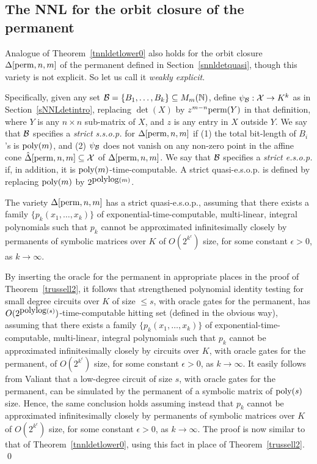 \documentclass[11pt]{article}
\begin{document}
\subsection{The NNL for the orbit closure of the permanent}
Analogue of Theorem~\ref{tnnldetlower0} also holds for the orbit closure $\Delta[{\mbox {perm}},n,m]$  of the permanent
defined in Section~\ref{snnldetquasi}, though this variety  is not explicit.
So let us call it {\em weakly explicit}.

Specifically, given any set ${\cal B}=\{B_1,\ldots,B_k\} \subseteq M_m(\mathbb{N})$, define 
$\psi_{{\cal B}}: {\cal X} \rightarrow K^k$ as in Section~\ref{sNNLdetintro},
replacing $\det(X)$  by  $z^{m-n} {\mbox {perm}}(Y)$ in that definition, where $Y$ is any $n\times n$ sub-matrix of $X$, and
$z$ is any entry in $X$ outside $Y$. We say that ${\cal B}$ specifies a 
{\em strict s.s.o.p.} 
for $\Delta[{\mbox {perm}},n,m]$ if 
(1) the total bit-length of $B_i$'s is ${\mbox {poly}}(m)$, and (2)
$\psi_{{\cal B}}$ does not vanish on any non-zero point in the affine cone  $\hat \Delta[{\mbox {perm}},n,m] \subseteq {\cal X}$ of
$\Delta[{\mbox {perm}},n,m]$.
We say that ${\cal B}$ specifies a {\em strict   e.s.o.p.} if, in addition,  it is ${\mbox {poly}}(m)$-time-computable. 
A strict quasi-e.s.o.p. is defined by replacing ${\mbox {poly}}(m)$  by $2^{{\mbox {polylog}}(m)}$.

\begin{theorem} 
The variety  $\Delta[{\mbox {perm}},n,m]$ has a strict quasi-e.s.o.p., assuming that there exists 
a family $\{p_k(x_1,\ldots,x_k)\}$ of  exponential-time-computable, 
multi-linear, integral polynomials  such that $p_k$
cannot be approximated infinitesimally closely by permanents 
of symbolic matrices  over $K$ of  
$O(2^{k^\epsilon})$ size, for some constant
$\epsilon >0$, as $k\rightarrow \infty$.
\end{theorem}

\proof 
By inserting the oracle for the permanent in 
appropriate places in the proof of Theorem~\ref{trussell2}, it follows that
strengthened polynomial identity testing for small degree 
circuits  over $K$ of size $\le s$, with oracle gates for the permanent,
has $O(2^{{\mbox {polylog}}(s)})$-time-computable hitting set (defined in the obvious way), assuming 
that there exists  a family $\{p_k(x_1,\ldots,x_k)\}$ 
of  exponential-time-computable,  multi-linear, integral
polynomials such   that $p_k$ 
cannot be approximated infinitesimally closely  by   circuits  over $K$, with  oracle gates
for the permanent,  of  $O(2^{k^\epsilon})$ size, for some   constant
$\epsilon >0$, as $k\rightarrow \infty$.  It easily follows from 
Valiant \cite{valiant2} that 
 a low-degree circuit of size $s$,  with oracle gates for the permanent, can be simulated by the permanent
of a symbolic matrix of ${\mbox {poly}}(s)$ size. Hence, the same conclusion holds assuming instead that
$p_k$ cannot be approximated infinitesimally closely  by permanents of symbolic matrices 
 over $K$  of  $O(2^{k^\epsilon})$ size, for some   constant
$\epsilon >0$, as $k\rightarrow \infty$. The proof is now similar
to that of Theorem~\ref{tnnldetlower0}, using this fact in place of Theorem~\ref{trussell2}. \qed 
\end{document}
